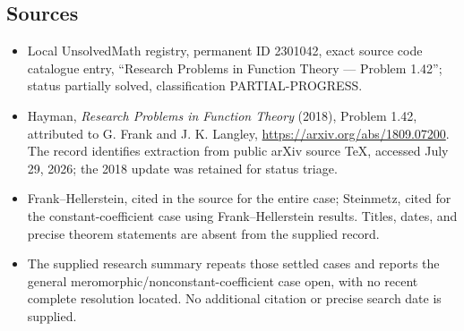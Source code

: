 \documentclass[11pt]{article}
\begin{document}
\subsection{Sources}
\begin{itemize}
\item Local UnsolvedMath registry, permanent ID 2301042, exact source code catalogue entry, ``Research Problems in Function Theory --- Problem 1.42''; status partially solved, classification PARTIAL-PROGRESS.
\item Hayman, \emph{Research Problems in Function Theory} (2018), Problem 1.42, attributed to G. Frank and J. K. Langley, \url{https://arxiv.org/abs/1809.07200}. The record identifies extraction from public arXiv source TeX, accessed July 29, 2026; the 2018 update was retained for status triage.
\item Frank--Hellerstein, cited in the source for the entire case; Steinmetz, cited for the constant-coefficient case using Frank--Hellerstein results. Titles, dates, and precise theorem statements are absent from the supplied record.
\item The supplied research summary repeats those settled cases and reports the general meromorphic/nonconstant-coefficient case open, with no recent complete resolution located. No additional citation or precise search date is supplied.
\end{itemize}
\end{document}
